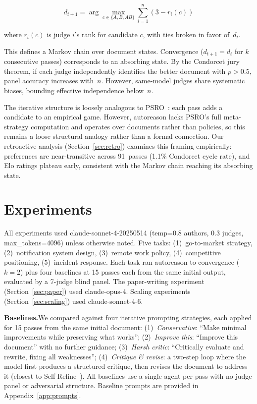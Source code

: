 \documentclass[10pt,twocolumn]{article}
\begin{document}
$$d_{t+1} = \arg\max_{c \in \{A, B, AB\}} \sum_{i=1}^{n} (3 - r_i(c))$$

where $r_i(c)$ is judge $i$'s rank for candidate $c$, with ties broken in favor of~$d_t$.

This defines a Markov chain over document states. Convergence ($d_{t+1} = d_t$ for $k$ consecutive passes) corresponds to an absorbing state. By the Condorcet jury theorem, if each judge independently identifies the better document with $p > 0.5$, panel accuracy increases with~$n$. However, same-model judges share systematic biases, bounding effective independence below~$n$.

The iterative structure is loosely analogous to PSRO~\cite{psro}: each pass adds a candidate to an empirical game. However, autoreason lacks PSRO's full meta-strategy computation and operates over documents rather than policies, so this remains a loose structural analogy rather than a formal connection. Our retroactive analysis (Section~\ref{sec:retro}) examines this framing empirically: preferences are near-transitive across 91~passes (1.1\% Condorcet cycle rate), and Elo ratings plateau early, consistent with the Markov chain reaching its absorbing state.

\section{Experiments}

All experiments used claude-sonnet-4-20250514 (temp=0.8 authors, 0.3 judges, max\_tokens=4096) unless otherwise noted. Five tasks: (1)~go-to-market strategy, (2)~notification system design, (3)~remote work policy, (4)~competitive positioning, (5)~incident response. Each task ran autoreason to convergence ($k{=}2$) plus four baselines at 15 passes each from the same initial output, evaluated by a 7-judge blind panel. The paper-writing experiment (Section~\ref{sec:paper}) used claude-opus-4. Scaling experiments (Section~\ref{sec:scaling}) used claude-sonnet-4-6.

\textbf{Baselines.}\enspace We compared against four iterative prompting strategies, each applied for 15 passes from the same initial document: (1)~\textit{Conservative}: ``Make minimal improvements while preserving what works''; (2)~\textit{Improve this}: ``Improve this document'' with no further guidance; (3)~\textit{Harsh critic}: ``Critically evaluate and rewrite, fixing all weaknesses''; (4)~\textit{Critique \& revise}: a two-step loop where the model first produces a structured critique, then revises the document to address it (closest to Self-Refine~\cite{selfrefine}). All baselines use a single agent per pass with no judge panel or adversarial structure. Baseline prompts are provided in Appendix~\ref{app:prompts}.
\end{document}
